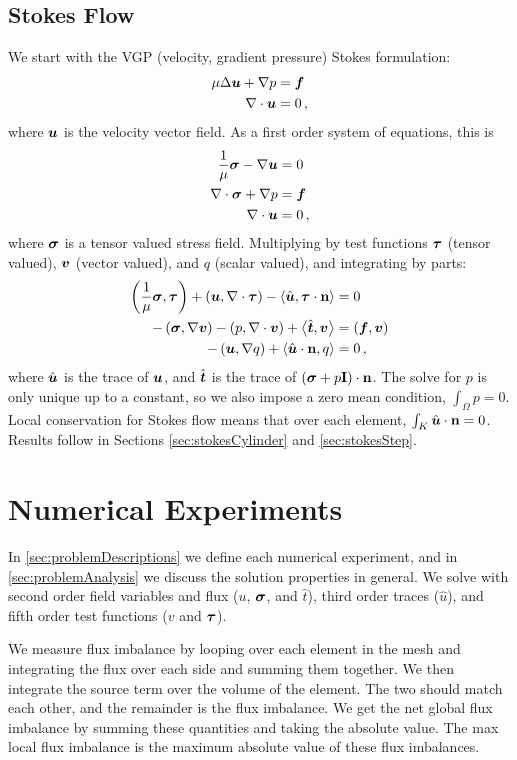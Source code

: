 \documentclass[Proposal.tex]{subfiles}
\begin{document}
\subsection{Stokes Flow}
We start with the VGP (velocity, gradient pressure) Stokes formulation:
\begin{align*}
   \mu\Delta \boldsymbol u+\nabla p&=\boldsymbol f\\
   \nabla\cdot\boldsymbol u&=0\,,
\end{align*}
where $\boldsymbol u$ is the velocity vector field.
As a first order system of equations, this is
\begin{align*}
   \frac{1}{\mu}\boldsymbol\sigma-\nabla\boldsymbol u&=0\\
   \nabla\cdot\boldsymbol\sigma+\nabla p&=\boldsymbol f\\
   \nabla\cdot\boldsymbol u&=0\,,
\end{align*}
where $\boldsymbol\sigma$ is a tensor valued stress field.
Multiplying by test functions $\boldsymbol\tau$ (tensor valued), $\boldsymbol v$ (vector
valued), and $q$ (scalar valued), and integrating by parts:
\begin{align*}
   \left( \frac{1}{\mu}\boldsymbol\sigma,\boldsymbol\tau \right)+\left( \boldsymbol u,\nabla\cdot\boldsymbol\tau \right)-\left\langle \hat
   {\boldsymbol u},\boldsymbol\tau\cdot\mathbf{n} \right\rangle&=0\\
   -\left( \boldsymbol\sigma,\nabla\boldsymbol v \right)-\left( p,\nabla\cdot\boldsymbol v \right)+\left\langle \hat {\boldsymbol t},\boldsymbol v \right\rangle&=\left( \boldsymbol f,\boldsymbol v \right)\\
   -\left( \boldsymbol u,\nabla q \right)+\left\langle \hat{\boldsymbol u}\cdot\mathbf{n},q \right\rangle&=0\,,
\end{align*}
where $\hat{\boldsymbol u}$ is the trace of $\boldsymbol u$, and $\hat{\boldsymbol t}$ is the trace of
$\left( \boldsymbol\sigma+p\mathbf{I} \right)\cdot\mathbf{n}$. The solve for $p$ is only unique
up to a constant, so we also impose a zero mean condition, $\int_\Omega p=0$.
Local conservation for Stokes flow means that over each element,
$\int_K\hat{\boldsymbol u}\cdot\mathbf{n}=0$. Results follow in Sections
\ref{sec:stokesCylinder} and \ref{sec:stokesStep}.

\section{Numerical Experiments}
\label{sec:lcNumerics}
In \ref{sec:problemDescriptions} we define each numerical experiment, and in
\ref{sec:problemAnalysis} we discuss the solution properties in general. We
solve with second order field variables and flux ($u$, $\boldsymbol\sigma$, and $\hat
t$), third order traces ($\hat u$), and fifth order test functions ($v$ and
$\boldsymbol\tau$).

We measure flux imbalance by looping over each element in the mesh and
integrating the flux over each side and summing them together. We then
integrate the source term over the volume of the element. The two should match
each other, and the remainder is the flux imbalance. We get the net global
flux imbalance by summing these quantities and taking the absolute value. The
max local flux imbalance is the maximum absolute value of these flux
imbalances.
\end{document}
